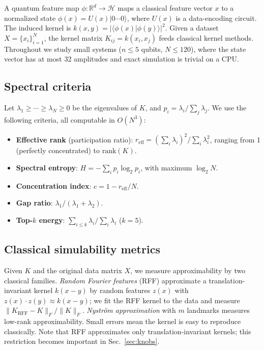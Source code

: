 \documentclass[a4paper,unpublished,onecolumn,nopdfoutputerror,12pt]{quantumarticle}
\begin{document}
A quantum feature map $\phi:\mathbb{R}^d\to\mathcal{H}$ maps a classical feature vector
$x$ to a normalized state $\phi(x)=U(x)|0\cdots0\rangle$, where $U(x)$ is a data-encoding
circuit. The induced kernel is $k(x,y)=|\langle\phi(x)|\phi(y)\rangle|^2$. Given a dataset
$X=\{x_i\}_{i=1}^{N}$, the kernel matrix $K_{ij}=k(x_i,x_j)$ feeds classical kernel methods.
Throughout we study small systems ($n\le5$ qubits, $N\le120$), where the state vector has
at most 32 amplitudes and exact simulation is trivial on a CPU.

\subsection{Spectral criteria}
\label{sec:defs-spectral}

Let $\lambda_1\ge\cdots\ge\lambda_N\ge0$ be the eigenvalues of $K$, and
$p_i=\lambda_i/\sum_j\lambda_j$. We use the following criteria, all computable in
$O(N^3)$:

\begin{itemize}
\item \textbf{Effective rank} (participation ratio): $r_{\mathrm{eff}}=(\sum_i\lambda_i)^2 /
\sum_i\lambda_i^2$, ranging from 1 (perfectly concentrated) to $\mathrm{rank}(K)$.
\item \textbf{Spectral entropy}: $H=-\sum_i p_i\log_2 p_i$, with maximum $\log_2 N$.
\item \textbf{Concentration index}: $c=1-r_{\mathrm{eff}}/N$.
\item \textbf{Gap ratio}: $\lambda_1/(\lambda_1+\lambda_2)$.
\item \textbf{Top-$k$ energy}: $\sum_{i\le k}\lambda_i/\sum_i\lambda_i$ ($k=5$).
\end{itemize}

\subsection{Classical simulability metrics}
\label{sec:defs-simul}

Given $K$ and the original data matrix $X$, we measure approximability by two classical
families. \emph{Random Fourier features} (RFF) \cite{rahimi2007} approximate a
translation-invariant kernel $k(x-y)$ by random features $z(x)$ with
$z(x)\cdot z(y)\approx k(x-y)$; we fit the RFF kernel to the data and measure
$\|K_{\mathrm{RFF}}-K\|_F/\|K\|_F$. \emph{Nystr\"om approximation} with $m$ landmarks
measures low-rank approximability. Small errors mean the kernel is easy to reproduce
classically. Note that RFF approximates only translation-invariant kernels; this
restriction becomes important in Sec.~\ref{sec:knobs}.
\end{document}
